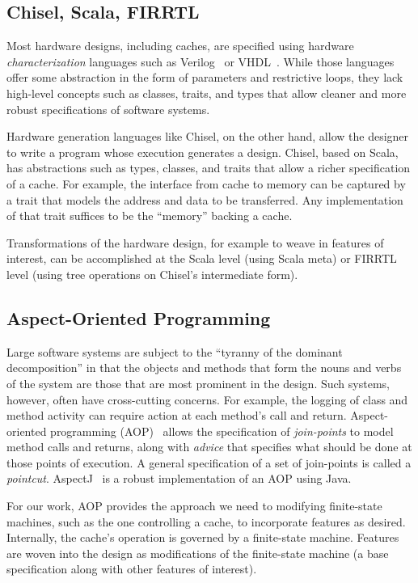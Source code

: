 \documentclass[conference]{IEEEtran}
\begin{document}
\subsection{Chisel, Scala, FIRRTL}

Most hardware designs, including caches, are specified using hardware \emph{characterization} languages such as Verilog~\cite{verilog} or VHDL~\cite{vhdl}.  While those languages offer some abstraction in the form of parameters and restrictive loops, they lack high-level concepts such as classes, traits, and types that allow cleaner and more robust specifications of software systems.

Hardware generation languages like Chisel, on the other hand, allow the designer to write a program whose execution generates a design.  Chisel, based on Scala, has abstractions such as types, classes, and traits that allow a richer specification of a cache.  For example, the interface from cache to memory can be captured by a trait that models the address and data to be transferred.  Any implementation of that trait suffices to be the ``memory'' backing a cache.

Transformations of the hardware design, for example to weave in features of interest, can be accomplished at the Scala level (using Scala meta) or FIRRTL level (using tree operations on Chisel's intermediate form).

\subsection{Aspect-Oriented Programming}

Large software systems are subject to the ``tyranny of the dominant decomposition'' in that the objects and methods that form the nouns and verbs of the system are those that are most prominent in the design.  Such systems, however, often have cross-cutting concerns.  For example, the logging of class and method activity can require action at each method's call and return.  Aspect-oriented programming (AOP)~\cite{Kicz97} allows the specification of \emph{join-points} to model method calls and returns, along with \emph{advice} that specifies what should be done at those points of execution.  A general specification of a set of join-points is called a \emph{pointcut}. AspectJ~\cite{AspectJ:01} is a robust implementation of an AOP using Java.

For our work, AOP provides the approach we need to modifying finite-state machines, such as the one controlling a cache, to incorporate features as desired.  
Internally, the cache's operation is governed by a finite-state machine.  Features are woven into the design as modifications of the finite-state machine (a base specification along with other features of interest).
\end{document}
